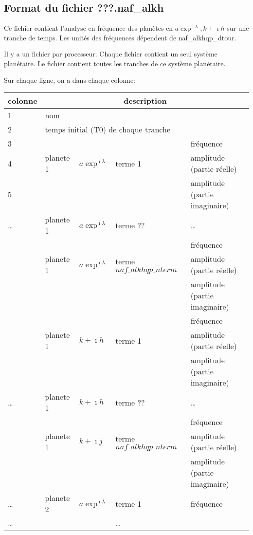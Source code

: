 \documentclass[11pt]{article}
\begin{document}
\subsection{Format du fichier {\bf ???.naf\_alkh} }

Ce fichier contient l'analyse en fr\'equence des plan\`etes en $a\exp^{\imath\lambda}, k+\imath h$ sur une tranche de temps. Les unit\'es des fr\'equences d\'ependent de naf\_alkhqp\_dtour.

Il y a un fichier par processeur. Chaque fichier contient un seul syst\`eme plan\'etaire. Le fichier contient toutes les tranches de ce syst\`eme plan\'etaire.


Sur chaque ligne, on a dans chaque colonne: 

\begin{tabularx}{\textwidth}{|l|l|l|l|X|}
 \hline
 colonne &      \multicolumn{4}{c|}{description} \\ \hline
1  &    \multicolumn{4}{l|}{nom} \\ \hline
2  &    \multicolumn{4}{l|}{temps initial (T0) de chaque tranche} \\ \hline
3 & &   & & fr\'equence\\
4 &planete 1 &$a\exp^{\imath\lambda}$& terme 1 & amplitude (partie r\'eelle)\\
5 & &   & &amplitude (partie imaginaire)\\ \hline
\dots & planete 1 &$a\exp^{\imath\lambda}$& terme ?? &\dots \\ \hline
 & &   & &fr\'equence\\
 &planete 1 & $a\exp^{\imath\lambda}$ & terme $naf\_alkhqp\_nterm$ & amplitude (partie r\'eelle)\\
 & &   & &amplitude (partie imaginaire)\\ \hline
 & &   & & fr\'equence\\
 &planete 1 &$k+\imath h$& terme 1 & amplitude (partie r\'eelle)\\
 & &   & &amplitude (partie imaginaire)\\ \hline
\dots & planete 1 &$k+\imath h$& terme ?? &\dots \\ \hline
 & &   & &fr\'equence\\
 &planete 1 & $k+\imath j$ & terme $naf\_alkhqp\_nterm$ & amplitude (partie r\'eelle)\\
 & &   & &amplitude (partie imaginaire)\\ \hline
\dots & planete 2 &$a\exp^{\imath\lambda}$& terme 1 &fr\'equence \\ \hline
\dots & & & \dots &\\\hline
\end{tabularx}
\end{document}

